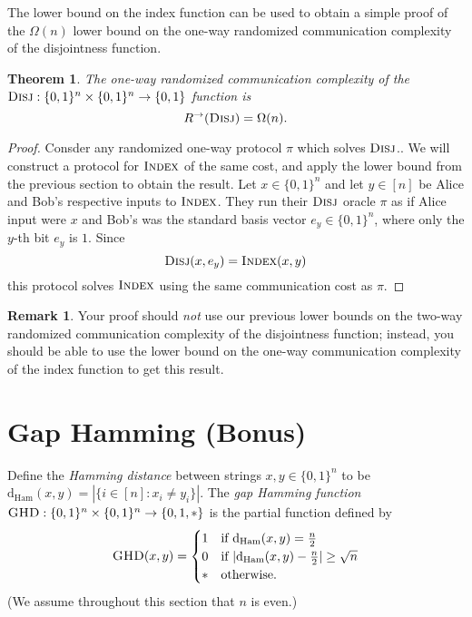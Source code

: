 \documentclass[11pt]{amsart}
\theoremstyle{plain}
\newtheorem{theorem}{Theorem}
\theoremstyle{definition}
\newtheorem{remark}{Remark}
\theoremstyle{plain}
\newcommand{\dHam}{\mathrm{d}_{\mathrm{Ham}}}
\newcommand{\Disj}{\textsc{Disj}}
\newcommand{\GHD}{\textsc{GHD}}
\newcommand{\Index}{\textsc{Index}}
\begin{document}
The lower bound on the index function can be used to obtain a simple proof of the $\Omega(n)$ lower bound on the one-way randomized communication complexity of the disjointness function.

\begin{theorem}
The one-way randomized communication complexity of the $\Disj : \{0,1\}^n \times \{0,1\}^n \to \{0,1\}$ function is
\[
R^\rightarrow(\Disj) = \Omega(n).
\]
\end{theorem}

\begin{proof}
Consder any randomized one-way protocol $\pi$ which solves $\Disj$.. We will construct a protocol for $\Index$ of the same cost, and apply the lower bound from the previous section to obtain the result. Let $x \in \{0,1\}^n$ and let $y \in [n]$ be Alice and Bob's respective inputs to $\Index$. They run their $\Disj$ oracle $\pi$ as if Alice input were $x$ and Bob's was the standard basis vector $e_y\in\{0,1\}^n$, where only the $y$-th bit $e_y$ is $1$. Since
$$\Disj(x,e_y) = \Index(x,y)$$ 
this protocol solves $\Index$ using the same communication cost as $\pi$.
\end{proof}

\begin{remark}
Your proof should \emph{not} use our previous lower bounds on the two-way randomized communication complexity of the disjointness function; instead, you should be able to use the lower bound on the one-way communication complexity of the index function to get this result.
\end{remark}



\newpage 
\section{Gap Hamming (Bonus)}

Define the \emph{Hamming distance} between strings $x,y \in \{0,1\}^n$ to be $\dHam(x,y) = |\{i \in [n] : x_i \neq y_i\}|$.
The \emph{gap Hamming function} $\GHD : \{0,1\}^n \times \{0,1\}^n \to \{0,1,*\}$ is the partial function defined by
\[
\GHD(x,y) = \begin{cases}
1 & \mbox{if } \dHam(x,y) = \frac n2 \\
0 & \mbox{if } |\dHam(x,y) - \frac n2| \ge \sqrt{n} \\
* & \mbox{otherwise.}
\end{cases}
\] 
(We assume throughout this section that $n$ is even.)
\end{document}
